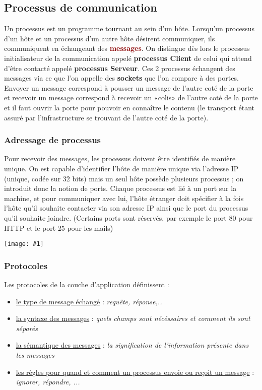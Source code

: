 \documentclass{article}
\newcommand{\dred}[1]{\textcolor{darkred}{\textbf{#1}}}
\newcommand{\ora}[1]{\textcolor{darko}{#1}}
\newcommand{\imgRT}[2]{\begin{center}\texttt{[image: \#1]}\end{center}}
\newcommand{\point}[2]{\item \ora{\underline{#1}} : \textit{#2}}
\begin{document}
\subsection{Processus de communication}

Un processus est un programme tournant au sein d'un hôte. Lorsqu'un processus d'un hôte et un processus d'un 
autre hôte désirent communiquer, ils communiquent en échangeant des \dred{messages}. On distingue dès lors le 
processus initialisateur de la communication appelé \textbf{processus Client} de celui qui attend d'être 
contacté appelé \textbf{processus Serveur}. Ces 2 processus échangent des messages via ce que l'on appelle des
\textbf{sockets} que l'on compare à des portes. Envoyer un message correspond à pousser un message de l'autre 
coté de la porte et recevoir un message correspond à recevoir un «colis» de l'autre coté de la porte et il faut
ouvrir la porte pour pouvoir en connaître le contenu (le transport étant assuré par l'infrastructure se trouvant
de l'autre coté de la porte).

\subsubsection{Adressage de processus}

Pour recevoir des messages, les processus doivent être identifiés de manière unique. On est capable d'identifier
l'hôte de manière unique via l'adresse IP (unique, codée sur 32 bits) mais un seul hôte possède plusieurs 
processus ; on introduit donc la notion de ports. Chaque processus est lié à un port sur la machine, et pour 
communiquer avec lui, l'hôte étranger doit spécifier à la fois l'hôte qu'il souhaite contacter via son adresse IP
ainsi que le port du processus qu'il souhaite joindre. (Certains ports sont réservés, par exemple le port 80 pour
HTTP et le port 25 pour les mails)

\imgRT{CN_013.png}{200}

\subsubsection{Protocoles}

Les protocoles de la couche d'application définissent : 
\begin{itemize}
\point{le type de message échangé}{requête, réponse,..}
\point{la syntaxe des messages}{quels champs sont nécéssaires et comment ils sont séparés}
\point{la sémantique des messages}{la signification de l'information présente dans les messages}
\point{les règles pour quand et comment un processus envoie ou reçoit un message}{ignorer, répondre, ...}
\end{itemize}
\end{document}
